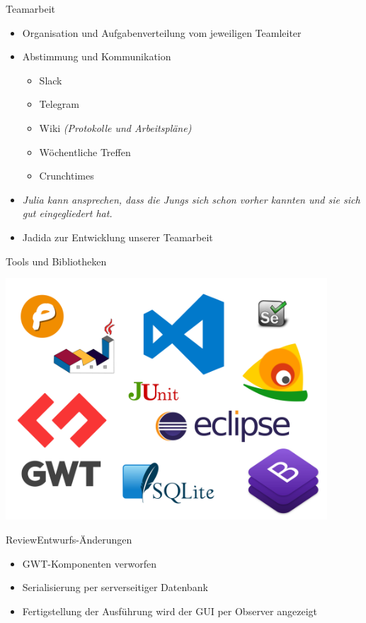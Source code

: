 \documentclass[10pt]{beamer}
\begin{document}
\begin{frame}{Teamarbeit}{}
	\begin{itemize}
		\item Organisation und Aufgabenverteilung vom jeweiligen Teamleiter
		\item Abstimmung und Kommunikation
		\begin{itemize}
			\item Slack
			\item Telegram
			\item Wiki \textit{(Protokolle und Arbeitspläne)}
			\pause
			\item Wöchentliche Treffen
			\item Crunchtimes
		\end{itemize}
		\pause
		\item \textit{Julia kann ansprechen, dass die Jungs sich schon vorher kannten und sie sich gut eingegliedert hat.}
		\item Jadida zur Entwicklung unserer Teamarbeit
	\end{itemize}
\end{frame}


\begin{frame}{Tools und Bibliotheken}{}
	\begin{center}
    \includegraphics[width=0.9\textwidth]{img/alle}
	\end{center}
\end{frame}

\begin{frame}{Review}{Entwurfs-Änderungen}
	\begin{itemize}
		\item GWT-Komponenten verworfen
		\item Serialisierung per serverseitiger Datenbank
		\item Fertigstellung der Ausführung wird der GUI per Observer angezeigt
	\end{itemize}
\end{frame}
\end{document}
